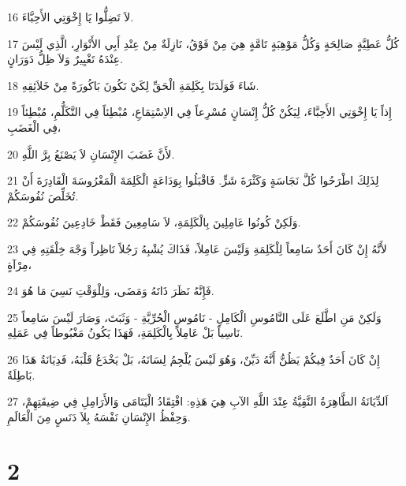 \par 16 لاَ تَضِلُّوا يَا إِخْوَتِي الأَحِبَّاءَ.
\par 17 كُلُّ عَطِيَّةٍ صَالِحَةٍ وَكُلُّ مَوْهِبَةٍ تَامَّةٍ هِيَ مِنْ فَوْقُ، نَازِلَةٌ مِنْ عِنْدِ أَبِي الأَنْوَارِ، الَّذِي لَيْسَ عِنْدَهُ تَغْيِيرٌ وَلاَ ظِلُّ دَوَرَانٍ.
\par 18 شَاءَ فَوَلَدَنَا بِكَلِمَةِ الْحَقِّ لِكَيْ نَكُونَ بَاكُورَةً مِنْ خَلاَئِقِهِ.
\par 19 إِذاً يَا إِخْوَتِي الأَحِبَّاءَ، لِيَكُنْ كُلُّ إِنْسَانٍ مُسْرِعاً فِي الاِسْتِمَاعِ، مُبْطِئاً فِي التَّكَلُّمِ، مُبْطِئاً فِي الْغَضَبِ،
\par 20 لأَنَّ غَضَبَ الإِنْسَانِ لاَ يَصْنَعُ بِرَّ اللَّهِ.
\par 21 لِذَلِكَ اطْرَحُوا كُلَّ نَجَاسَةٍ وَكَثْرَةَ شَرٍّ. فَاقْبَلُوا بِوَدَاعَةٍ الْكَلِمَةَ الْمَغْرُوسَةَ الْقَادِرَةَ أَنْ تُخَلِّصَ نُفُوسَكُمْ.
\par 22 وَلَكِنْ كُونُوا عَامِلِينَ بِالْكَلِمَةِ، لاَ سَامِعِينَ فَقَطْ خَادِعِينَ نُفُوسَكُمْ.
\par 23 لأَنَّهُ إِنْ كَانَ أَحَدٌ سَامِعاً لِلْكَلِمَةِ وَلَيْسَ عَامِلاً، فَذَاكَ يُشْبِهُ رَجُلاً نَاظِراً وَجْهَ خِلْقَتِهِ فِي مِرْآةٍ،
\par 24 فَإِنَّهُ نَظَرَ ذَاتَهُ وَمَضَى، وَلِلْوَقْتِ نَسِيَ مَا هُوَ.
\par 25 وَلَكِنْ مَنِ اطَّلَعَ عَلَى النَّامُوسِ الْكَامِلِ - نَامُوسِ الْحُرِّيَّةِ - وَثَبَتَ، وَصَارَ لَيْسَ سَامِعاً نَاسِياً بَلْ عَامِلاً بِالْكَلِمَةِ، فَهَذَا يَكُونُ مَغْبُوطاً فِي عَمَلِهِ.
\par 26 إِنْ كَانَ أَحَدٌ فِيكُمْ يَظُنُّ أَنَّهُ دَيِّنٌ، وَهُوَ لَيْسَ يُلْجِمُ لِسَانَهُ، بَلْ يَخْدَعُ قَلْبَهُ، فَدِيَانَةُ هَذَا بَاطِلَةٌ.
\par 27 اَلدِّيَانَةُ الطَّاهِرَةُ النَّقِيَّةُ عِنْدَ اللَّهِ الآبِ هِيَ هَذِهِ: افْتِقَادُ الْيَتَامَى وَالأَرَامِلِ فِي ضِيقَتِهِمْ، وَحِفْظُ الإِنْسَانِ نَفْسَهُ بِلاَ دَنَسٍ مِنَ الْعَالَمِ.

\chapter{2}

